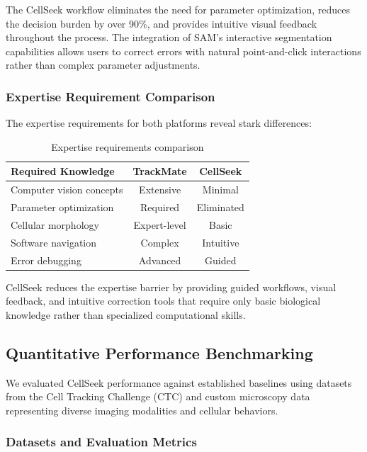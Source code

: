 \documentclass[../cellseek_paper.tex]{subfiles}
\begin{document}
The CellSeek workflow eliminates the need for parameter optimization, reduces the decision burden by over 90\%, and provides intuitive visual feedback throughout the process. The integration of SAM's interactive segmentation capabilities allows users to correct errors with natural point-and-click interactions rather than complex parameter adjustments.

\subsubsection{Expertise Requirement Comparison}

The expertise requirements for both platforms reveal stark differences:

\begin{table}[H]
  \centering
  \caption{Expertise requirements comparison}
  \begin{tabular}{lcc}
    \toprule
    \textbf{Required Knowledge} & \textbf{TrackMate} & \textbf{CellSeek} \\
    \midrule
    Computer vision concepts    & Extensive          & Minimal           \\
    Parameter optimization      & Required           & Eliminated        \\
    Cellular morphology         & Expert-level       & Basic             \\
    Software navigation         & Complex            & Intuitive         \\
    Error debugging             & Advanced           & Guided            \\
    \bottomrule
  \end{tabular}
\end{table}

CellSeek reduces the expertise barrier by providing guided workflows, visual feedback, and intuitive correction tools that require only basic biological knowledge rather than specialized computational skills.

\subsection{Quantitative Performance Benchmarking}

We evaluated CellSeek performance against established baselines using datasets from the Cell Tracking Challenge (CTC) and custom microscopy data representing diverse imaging modalities and cellular behaviors.

\subsubsection{Datasets and Evaluation Metrics}
\end{document}
